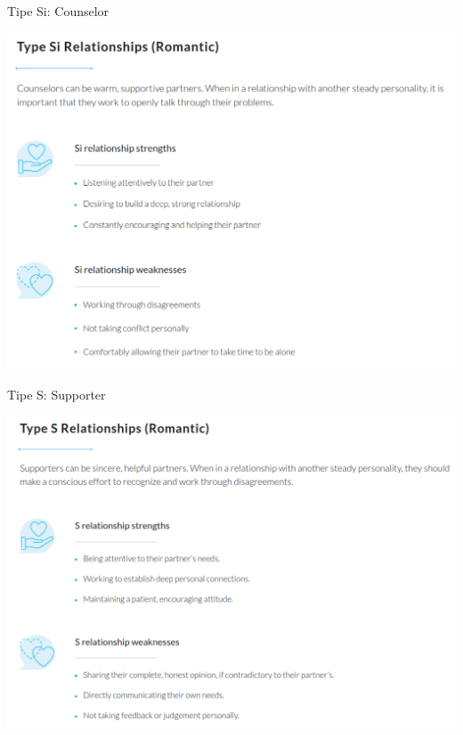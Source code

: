 \documentclass{beamer}
\theoremstyle{mystyle}
\begin{document}
\begin{frame}{Tipe Si: Counselor}
	\begin{center}
		\includegraphics[scale=.275]{images/Si}
	\end{center}
\end{frame}

\begin{frame}{Tipe S: Supporter}
	\begin{center}
		\includegraphics[scale=.275]{images/S}
	\end{center}
\end{frame}
\end{document}
